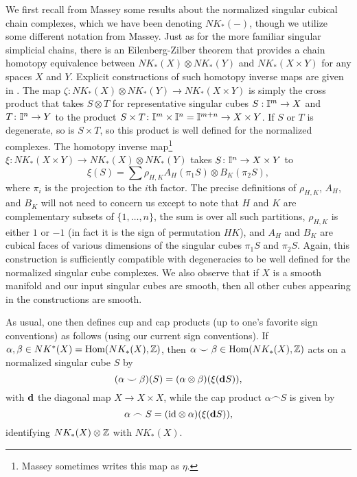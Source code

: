 We first recall from Massey \cite[Chapter XI]{Mas91} some results about the normalized singular cubical chain complexes, which we have been denoting $NK_*(-)$, though we utilize some different notation from Massey. Just as for the more familiar singular simplicial chains, there is an Eilenberg-Zilber theorem that provides a chain homotopy equivalence between $NK_*(X) \otimes NK_*(Y)$ and $NK_*(X \times Y)$ for any spaces $X$ and $Y$. Explicit constructions of such homotopy inverse maps are given in \cite[Section XI.5]{Mas91}.
The map $\zeta: NK_*(X) \otimes NK_*(Y) \to NK_*(X \times Y)$ is simply the cross product that takes $S \otimes T$ for representative singular cubes $S: \mathbb{I}^m \to X$ and $T \colon \mathbb{I}^n \to Y$ to the product $S \times T \colon \mathbb{I}^m \times \mathbb{I}^n = \mathbb{I}^{m+n} \to X \times Y$. If $S$ or $T$ is degenerate, so is $S \times T$, so this product is well defined for the normalized complexes. The homotopy inverse map\footnote{Massey sometimes writes this map as $\eta$.} $\xi: NK_*(X \times Y) \to NK_*(X) \otimes NK_*(Y)$ takes $S \colon \mathbb{I}^n \to X \times Y$ to
$$\xi(S) = \sum \rho_{H,K}A_H(\pi_1S) \otimes B_K(\pi_2S),$$ where $\pi_i$ is the projection to the $i$th factor. The precise definitions of $\rho_{H,K}$, $A_H$, and $B_K$ will not need to concern us except to note that $H$ and $K$ are complementary subsets of $\{1,\ldots, n\}$, the sum is over all such partitions, $\rho_{H,K}$ is either $1$ or $-1$ (in fact it is the sign of permutation $HK$), and $A_H$ and $B_K$ are cubical faces of various dimensions of the singular cubes $\pi_1S$ and $\pi_2S$. Again, this construction is sufficiently compatible with degeneracies to be well defined for the normalized singular cube complexes. We also observe that if $X$ is a smooth manifold and our input singular cubes are smooth, then all other cubes appearing in the constructions are smooth.

As usual, one then defines cup and cap products (up to one's favorite sign conventions) as follows (using our current sign conventions). If $\alpha, \beta \in NK^*(X) = \textup{Hom}(NK_*(X),\mathbb{Z})$, then $\alpha\smile \beta \in \textup{Hom}(NK_*(X),\mathbb{Z})$ acts on a normalized singular cube $S$ by
\begin{equation}\label{E: cubical cup}
(\alpha \smile \beta)(S) = (\alpha \otimes \beta)(\xi(\mathbf{d} S)),
\end{equation}
with $\mathbf{d}$ the diagonal map $X \to X \times X$,
while the cap product $\alpha\frown S$ is given by
\begin{equation}\label{E: cubical cap}
\alpha\frown S = (\mathrm{id} \otimes \alpha) (\xi(\mathbf{d} S)),
\end{equation}
identifying $NK_*(X) \otimes \mathbb{Z}$ with $NK_*(X)$.

